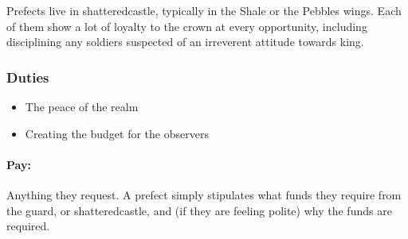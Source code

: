 \begin{multicols}{2}
Prefects live in \gls{shatteredcastle}, typically in the Shale or the Pebbles wings.
Each of them show a lot of loyalty to the crown at every opportunity, including disciplining any soldiers suspected of an irreverent attitude towards \gls{king}.

\subsubsection{Duties}

\begin{itemize}

  \item
  The peace of the realm
  \item
  Creating the budget for the observers

\end{itemize}

\paragraph{Pay:}
Anything they request.
A prefect simply stipulates what funds they require from the \gls{guard}, or \gls{shatteredcastle}, and (if they are feeling polite) why the funds are required.

\end{multicols}

